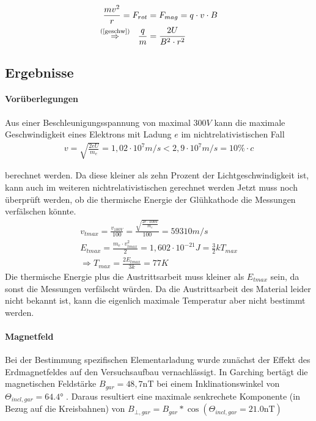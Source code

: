 \documentclass[11pt, a4paper]{article}
\begin{document}
    \begin{align}{}
        \frac{mv^2}{r} = F_{rot} &= F_{mag} = q \cdot v \cdot B \\
        \overset{\text{(\ref{geschw})}}{\Rightarrow} \ \  \frac{q}{m} &= \frac{2U}{B^2 \cdot r^2} \\
    \end{align}

    \subsection{Ergebnisse}
    \paragraph{Vorüberlegungen}

    Aus einer Beschleunigungsspannung von maximal $300 \si{V}$ kann die maximale Geschwindigkeit eines Elektrons mit Ladung $e$ im nichtrelativistischen Fall
    \begin{align}
        v = \sqrt{\frac{2 e U}{m_e}} = 1,02 \cdot 10^{7} \si{m/s} < 2,9 \cdot 10^{7} \si{m/s} = 10\% \cdot c
    \end{align}


    berechnet werden. Da diese kleiner als zehn Prozent der Lichtgeschwindigkeit ist, kann auch im weiteren nichtrelativistischen gerechnet werden
    Jetzt muss noch überprüft werden, ob die thermische Energie der Glühkathode die Messungen verfälschen könnte.
    \begin{align}
        v_{tmax} = \frac{v_{100V}}{100} = \frac{\sqrt{\frac{2 e \cdot 100 \si{V}}{m_e}}}{100} = 59310 \si{m \per s} \\
        E_{tmax} = \frac{m_e \cdot v_{tmax}^2}{2} = 1,602 \cdot 10^{-21} \si{J} = \frac{3}{2} k T_{max} \\
        \Rightarrow T_{max} = \frac{2 E_{tmax}}{3 k} = 77K
    \end{align}
    Die thermische Energie plus die Austrittsarbeit muss kleiner als $E_{tmax}$ sein, da sonst die Messungen verfälscht würden. Da die Austrittsarbeit des Material leider nicht bekannt ist, kann die eigenlich maximale Temperatur aber nicht bestimmt werden.

    \paragraph{Magnetfeld}
        Bei der Bestimmung spezifischen Elementarladung wurde zunächst der Effekt des Erdmagnetfeldes auf den Versuchsaufbau
        vernachlässigt. In Garching bertägt die magnetischen Feldstärke $B_{gar} = 48,7 \si{\nano\tesla}$ \cite[]{magnetic_field} bei einem Inklinationswinkel von $\Theta_{incl,gar} = 64.4\si{\degree}$ \cite[]{magnetic_field}. 
        Daraus resultiert eine maximale senkrechete Komponente (in Bezug auf die Kreisbahnen) von 
        $ B_{\bot,gar} = B_{gar} * \cos(\Theta_{incl,gar} = 21.0 \si{\nano\tesla})$
        
\end{document}
